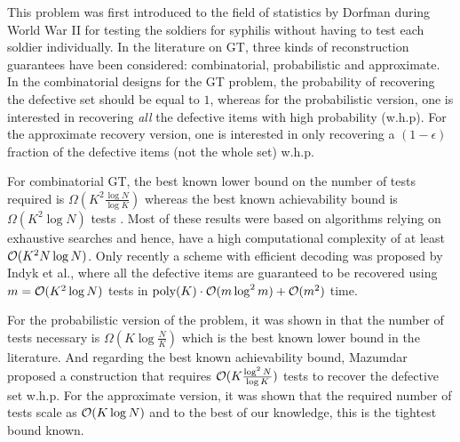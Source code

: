 \documentclass[conference,twocolumn]{IEEEtran}
\begin{document}
This problem was first introduced to the field of statistics by Dorfman \cite{dorfman1943detection} during World War II for testing the soldiers for syphilis without having to test each soldier individually. In the literature on GT, three kinds of reconstruction guarantees have been considered: combinatorial, probabilistic and approximate. In the combinatorial designs for the GT problem, the probability of recovering the defective set should be equal to $1$, whereas for the probabilistic version, one is interested in recovering \textit{all} the defective items with high probability (w.h.p).
For the approximate recovery version, one is interested in only recovering a $(1-\epsilon)$ fraction of the defective items (not the whole set) w.h.p. %

For combinatorial GT, the best known lower bound on the number of tests required is $\Omega(K^2\frac{\log N}{\log K})$ \cite{d1982bounds} whereas the best known achievability bound is $\Omega(K^2 \log N)$ tests \cite{kautz1964nonrandom,porat2011explicit}. Most of these results were based on algorithms relying on exhaustive searches and hence, have a high computational complexity of at least $\mathcal{O}(K^2 N\log N)$. Only recently a scheme with efficient decoding was proposed by Indyk et al., \cite{indyk2010efficiently} where all the defective items are guaranteed to be recovered using $m=\mathcal{O}(K^2\log N)$ tests in $\text{poly}(K)\cdot \mathcal{O}(m \log^2 m )+\mathcal{O}(m^2)$ time.

For the probabilistic version of the problem, it was shown in \cite{chan2014non,atia2012boolean} that the number of tests necessary is $\Omega(K\log \frac{N}{K})$ which is the best known lower bound in the literature. And regarding the best known achievability bound, Mazumdar \cite{mazumdar2015nonadaptive} proposed a construction that requires $\mathcal{O}(K\frac{\log^2 N}{\log K})$ tests to recover the defective set w.h.p. For the approximate version, it was shown \cite{atia2012boolean} that the required number of tests scale as $\mathcal{O}(K\log N)$ and to the best of our knowledge, this is the tightest bound known.
\end{document}
